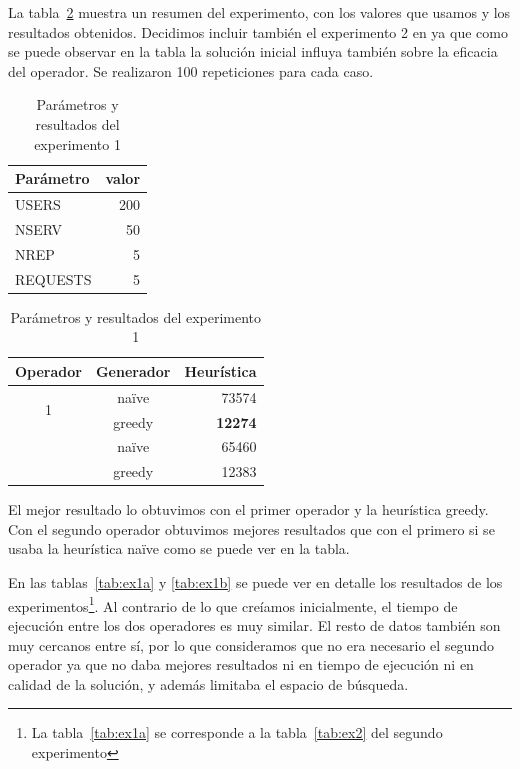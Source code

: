La tabla~\ref{tab:ex1} muestra un resumen del experimento, con los valores que usamos y los resultados obtenidos.
Decidimos incluir también el experimento 2 en ya que como se puede observar en la tabla la solución inicial
influya también sobre la eficacia del operador. Se realizaron 100 repeticiones para cada caso.

\begin{table}[H]
    \caption{Parámetros y resultados del experimento 1}%
    \label{tab:ex1}
    \vspace{-1em}
    \begin{center}
    \begin{tabular}{lr}
    \toprule
    Parámetro & valor \\
    \midrule
    USERS & 200 \\
    NSERV & 50 \\
    NREP & 5 \\
    REQUESTS & 5\\
    \bottomrule
    \end{tabular}
    \hspace{2em}
    \begin{tabular}{ccr}
    \toprule
    Operador & Generador & Heurística \\
    \midrule
    \multirow{2}{*}{1} & naïve &  73574\\
    {} & greedy & \textbf{12274} \\
    \addlinespace[0.5em]
    \multirow{2}{*}{2} & naïve &  65460\\
    {} & greedy & 12383 \\
    \bottomrule
    \end{tabular}
    \end{center}
\end{table}
\vspace{-2em}

El mejor resultado lo obtuvimos con el primer operador y la heurística greedy. Con el segundo operador
obtuvimos mejores resultados que con el primero si se usaba la heurística naïve como se puede ver en la
tabla.

En las tablas~\ref{tab:ex1a} y \ref{tab:ex1b} se puede ver en detalle los resultados de los experimentos\footnote{La tabla~\ref{tab:ex1a} se corresponde a la tabla~\ref{tab:ex2} del segundo experimento}. Al contrario
de lo que creíamos inicialmente, el tiempo de ejecución entre los dos operadores es muy similar. El resto
de datos también son muy cercanos entre sí, por lo que consideramos que no era necesario el segundo operador
ya que no daba mejores resultados ni en tiempo de ejecución ni en calidad de la solución, y además limitaba
el espacio de búsqueda.

